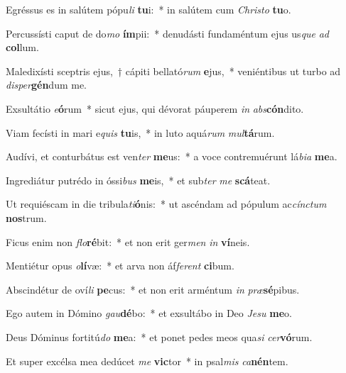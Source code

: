 \item Egréssus es in salútem pópu\textit{li} \textbf{tu}i:~* in salútem cum \textit{Chris}\textit{to} \textbf{tu}o.
\item Percussísti caput de do\textit{mo} \textbf{ím}pii:~* denudásti fundaméntum ejus us\textit{que} \textit{ad} \textbf{col}lum.
\item Maledixísti sceptris ejus,~† cápiti bellató\textit{rum} \textbf{e}jus,~* veniéntibus ut turbo ad \textit{di}\textit{sper}\textbf{gén}dum me.
\item Exsultátio \textit{e}\textbf{ó}rum~* sicut ejus, qui dévorat páuperem \textit{in} \textit{abs}\textbf{cón}dito.
\item Viam fecísti in mari e\textit{quis} \textbf{tu}is,~* in luto aquá\textit{rum} \textit{mul}\textbf{tá}rum.
\item Audívi, et conturbátus est ven\textit{ter} \textbf{me}us:~* a voce contremuérunt lá\textit{bi}\textit{a} \textbf{me}a.
\item Ingrediátur putrédo in óssi\textit{bus} \textbf{me}is,~* et sub\textit{ter} \textit{me} \textbf{scá}teat.
\item Ut requiéscam in die tribula\textit{ti}\textbf{ó}nis:~* ut ascéndam ad pópulum ac\textit{cínc}\textit{tum} \textbf{nos}trum.
\item Ficus enim non \textit{flo}\textbf{ré}bit:~* et non erit ger\textit{men} \textit{in} \textbf{ví}neis.
\item Mentiétur opus \textit{o}\textbf{lí}væ:~* et arva non áf\textit{fe}\textit{rent} \textbf{ci}bum.
\item Abscindétur de oví\textit{li} \textbf{pe}cus:~* et non erit arméntum \textit{in} \textit{præ}\textbf{sé}pibus.
\item Ego autem in Dómino \textit{gau}\textbf{dé}bo:~* et exsultábo in Deo \textit{Je}\textit{su} \textbf{me}o.
\item Deus Dóminus fortitú\textit{do} \textbf{me}a:~* et ponet pedes meos qua\textit{si} \textit{cer}\textbf{vó}rum.
\item Et super excélsa mea dedúcet \textit{me} \textbf{vic}tor~* in psal\textit{mis} \textit{ca}\textbf{nén}tem.
